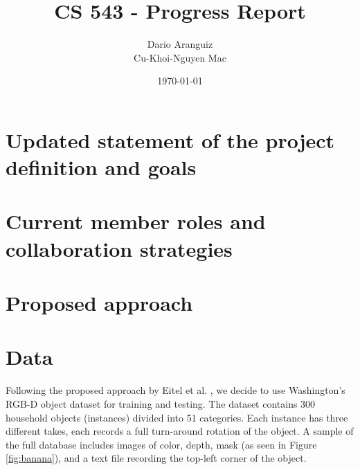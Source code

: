 \documentclass[paper=letter, fontsize=12pt]{article}
\title{CS 543 - Progress Report}
\author{
        Dario Aranguiz \\
        Cu-Khoi-Nguyen Mac
        }
\date{\today}
\begin{document}
\maketitle

\section{Updated statement of the project definition and goals}

\section{Current member roles and collaboration strategies}

\section{Proposed approach}

\section{Data}
Following the proposed approach by Eitel et al. \cite{Eitel2015}, we decide to use Washington's RGB-D object dataset \cite{Lai2011} for training and testing. The dataset contains 300 household objects (instances) divided into 51 categories. Each instance has three different takes, each records a full turn-around rotation of the object. A sample of the full database includes images of color, depth, mask (as seen in Figure \ref{fig:banana}), and a text file recording the top-left corner of the object.
\end{document}
